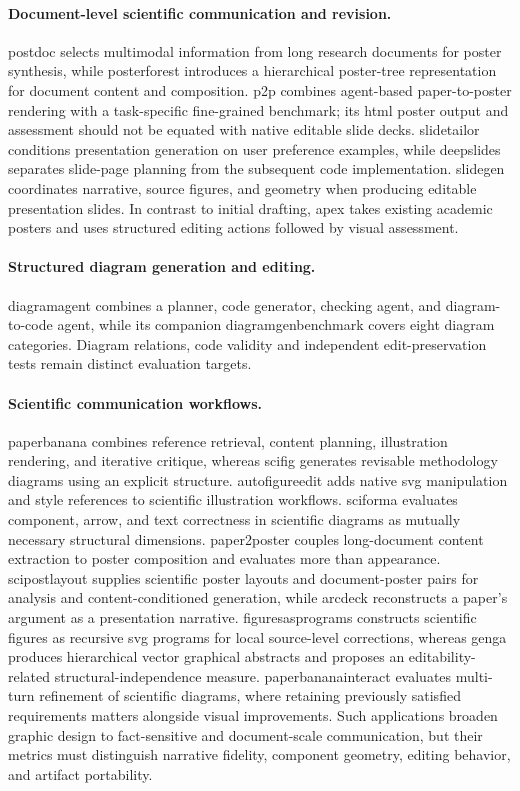 \paragraph{Document-level scientific communication and revision.}
\ac{postdoc} selects multimodal information from long research documents for poster synthesis, while \ac{posterforest} introduces a hierarchical poster-tree representation for document content and composition.
\ac{p2p} combines agent-based paper-to-poster rendering with a task-specific fine-grained benchmark; its \ac{html} poster output and assessment should not be equated with native editable slide decks.
\ac{slidetailor} conditions presentation generation on user preference examples, while \ac{deepslides} separates slide-page planning from the subsequent code implementation.
\ac{slidegen} coordinates narrative, source figures, and geometry when producing editable presentation slides.
In contrast to initial drafting, \ac{apex} takes existing academic posters and uses structured editing actions followed by visual assessment.
\paragraph{Structured diagram generation and editing.}
\ac{diagramagent} combines a planner, code generator, checking agent, and diagram-to-code agent, while its companion \ac{diagramgenbenchmark} covers eight diagram categories.
Diagram relations, code validity and independent edit-preservation tests remain distinct evaluation targets.

\paragraph{Scientific communication workflows.}
\ac{paperbanana} combines reference retrieval, content planning, illustration rendering, and iterative critique, whereas \ac{scifig} generates revisable methodology diagrams using an explicit structure.
\ac{autofigureedit} adds native \ac{svg} manipulation and style references to scientific illustration workflows.
\ac{sciforma} evaluates component, arrow, and text correctness in scientific diagrams as mutually necessary structural dimensions.
\ac{paper2poster} couples long-document content extraction to poster composition and evaluates more than appearance.
\ac{scipostlayout} supplies scientific poster layouts and document-poster pairs for analysis and content-conditioned generation, while \ac{arcdeck} reconstructs a paper's argument as a presentation narrative.
\ac{figuresasprograms} constructs scientific figures as recursive \ac{svg} programs for local source-level corrections, whereas \ac{genga} produces hierarchical vector graphical abstracts and proposes an editability-related structural-independence measure.
\ac{paperbananainteract} evaluates multi-turn refinement of scientific diagrams, where retaining previously satisfied requirements matters alongside visual improvements.
Such applications broaden graphic design to fact-sensitive and document-scale communication, but their metrics must distinguish narrative fidelity, component geometry, editing behavior, and artifact portability.
